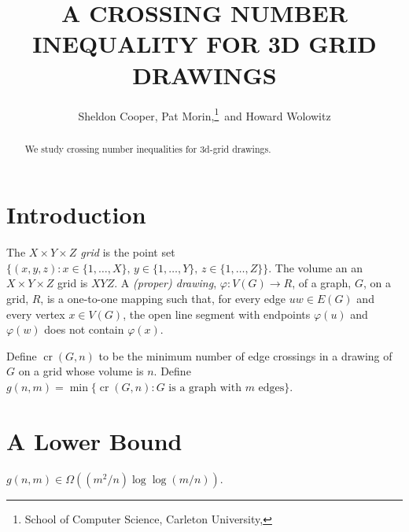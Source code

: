 \documentclass{patmorin}
\title{\MakeUppercase{A Crossing Number Inequality for 3D Grid Drawings}}
\author{Sheldon Cooper, Pat Morin,\thanks{School of Computer Science, Carleton University, \email{morin@scs.carleton.ca}}\ and Howard Wolowitz}
\DeclareMathOperator{\crs}{cr}
\begin{document}
\maketitle

\begin{abstract}
   We study crossing number inequalities for 3d-grid drawings.
\end{abstract}

\section{Introduction}

The \emph{$X\times Y\times Z$ grid} is the point set $\{(x,y,z):
x\in\{1,\ldots,X\},\, y\in\{1,\ldots,Y\},\, z\in\{1,\ldots,Z\}\}$.
The volume an an $X\times Y\times Z$ grid is $XYZ$. A \emph{(proper)
drawing}, $\varphi:V(G)\rightarrow R$, of a graph, $G$, on a grid, $R$,
is a one-to-one mapping such that, for every edge $uw\in E(G)$ and every
vertex $x\in V(G)$, the open line segment with endpoints $\varphi(u)$
and $\varphi(w)$ does not contain $\varphi(x)$.

Define $\crs(G,n)$ to be the minimum number of edge crossings
in a drawing of $G$ on a grid whose volume is $n$.  Define
$g(n,m)=\min\{\crs(G,n):\text{$G$ is a graph with $m$ edges}\}$.


\section{A Lower Bound}

\begin{thm}
  $g(n,m) \in \Omega((m^2/n)\log\log (m/n))$.
\end{thm}
\end{document}
